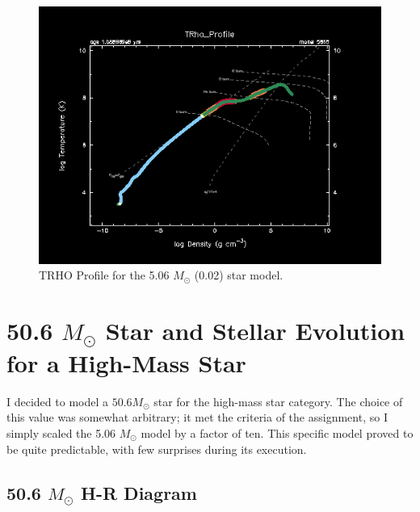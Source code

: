 \documentclass[fleqn,usenatbib]{mnras}
\begin{document}
\begin{figure}
    \centering
    \includegraphics[width=\columnwidth]{trho_profile_05865.png}
    \caption{TRHO Profile for the 5.06 $M_\odot$ (0.02) star model.}
    \label{fig:5.06_Msol_0.02_trho_figure}
\end{figure}



\section{50.6 \(M_\odot\) Star and Stellar Evolution for a High-Mass Star}

I decided to model a \(50.6 M_\odot\) star for the high-mass star category. The choice of this value was somewhat arbitrary; it met the criteria of the assignment, so I simply scaled the 5.06 \(M_\odot\) model by a factor of ten. This specific model proved to be quite predictable, with few surprises during its execution.


\subsection{50.6 \(M_\odot\) H-R Diagram}
\end{document}
